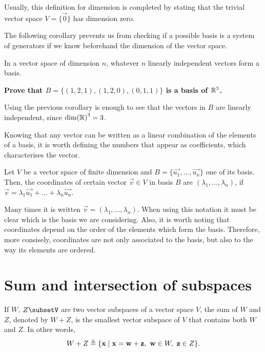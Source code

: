 \begin{note}
    Usually, this definition for dimension is completed by stating that the trivial vector space $V = \{\vec{0}\} $ has dimension zero.
\end{note}

The following corollary prevents us from checking if a possible basis is a system of generators if we know
beforehand the dimension of the vector space.

\begin{coro}
    In a vector space of dimension $n$, whatever $n$ linearly independent vectors form a basis.
\end{coro}

\begin{example}
    \textbf{Prove that $B = \{\left( 1, 2, 1 \right) , \left( 1, 2, 0 \right), \left( 0, 1, 1 \right)\} $ is
    a basis of $\R^3$.}

    Using the previous corollary is enough to see that the vectors in $B$ are linearly independent, since
    $\dim \R^3 = 3$.
\end{example}

Knowing that any vector can be written as a linear combination of the elements of a basis, it is worth
defining the numbers that appear as coefficients, which characterises the vector.

\begin{defn}[Coordinates]
    Let $V$ be a vector space of finite dimension and $B = \{\vec{u_1}, \ldots, \vec{u_n}\} $ one of its
    basis. Then, the coordinates of certain vector $\vec{v}\in V$ in basis $B$ are $\left( \lambda_1, \ldots,
    \lambda_n\right) $, if $\vec{v} = \lambda_1\vec{u_1} + \ldots + \lambda_n\vec{u_n}$.
\end{defn}

\begin{note}
    Many times it is written $\vec{v} = \left( \lambda_1, \ldots, \lambda_n \right) $. When using this
    notation it must be clear which is the basis we are considering. Also, it is worth noting that coordinates
    depend on the order of the elements which form the basis. Therefore, more consisely, coordinates are not
    only associated to the basis, but also to the way its elements are ordered.
\end{note}

\section{Sum and intersection of subspaces}
\begin{prop}
    If $W$, $Z\subsetV$ are two vector subspaces of a vector space $V$, the sum of $W$ and $Z$, denoted by
    $W + Z$, is the smallest vector subspace of $V$ that contains both $W$ and $Z$. In other words,
    \begin{equation}
        W + Z \triangleq \{\mathbf{x}\; | \; \mathbf{x} = \mathbf{w} + \mathbf{z},\ \mathbf{w}\in W,\ \mathbf{z}\in Z\}.
    \end{equation}
\end{prop}

